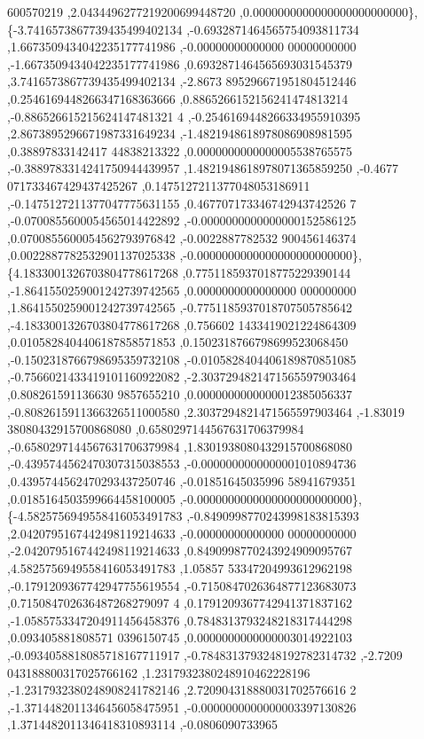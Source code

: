 \begin{DoxyCode}
      600570219 ,2.0434496277219200699448720 ,0.0000000000000000000000000\},
\{-3.7416573867739435499402134 ,-0.6932871464565754093811734 ,1.6673509434042235177741986 ,-0.00000000000000
      00000000000 ,-1.6673509434042235177741986 ,0.6932871464565693031545379 ,3.7416573867739435499402134 ,-2.8673
      895296671951804512446 ,0.2546169448266347168363666 ,0.8865266152156241474813214 ,-0.886526615215624147481321
      4 ,-0.2546169448266334955910395 ,2.8673895296671987331649234 ,-1.4821948618978086908981595 ,0.38897833142417
      44838213322 ,0.0000000000000005538765575 ,-0.3889783314241750944439957 ,1.4821948618978071365859250 ,-0.4677
      071733467429437425267 ,0.1475127211377048053186911 ,-0.1475127211377047775631155 ,0.467707173346742943742526
      7 ,-0.0700855600054565014422892 ,-0.0000000000000000152586125 ,0.0700855600054562793976842 ,-0.0022887782532
      900456146374 ,0.0022887782532901137025338 ,-0.0000000000000000000000000\},
\{4.1833001326703804778617268 ,0.7751185937018775229390144 ,-1.8641550259001242739742565 ,0.0000000000000000
      000000000 ,1.8641550259001242739742565 ,-0.7751185937018707505785642 ,-4.1833001326703804778617268 ,0.756602
      1433419021224864309 ,0.0105828404406187858571853 ,0.1502318766798699523068450 ,-0.1502318766798695359732108 
      ,-0.0105828404406189870851085 ,-0.7566021433419101160922082 ,-2.3037294821471565597903464 ,0.808261591136630
      9857655210 ,0.0000000000000012385056337 ,-0.8082615911366326511000580 ,2.3037294821471565597903464 ,-1.83019
      38080432915700868080 ,0.6580297144567631706379984 ,-0.6580297144567631706379984 ,1.8301938080432915700868080
       ,-0.4395744562470307315038553 ,-0.0000000000000001010894736 ,0.4395744562470293437250746 ,-0.01851645035996
      58941679351 ,0.0185164503599664458100005 ,-0.0000000000000000000000000\},
\{-4.5825756949558416053491783 ,-0.8490998770243998183815393 ,2.0420795167442498119214633 ,-0.00000000000000
      00000000000 ,-2.0420795167442498119214633 ,0.8490998770243924909095767 ,4.5825756949558416053491783 ,1.05857
      53347204993612962198 ,-0.1791209367742947755619554 ,-0.7150847026364877123683073 ,0.715084702636487268279097
      4 ,0.1791209367742941371837162 ,-1.0585753347204911456458376 ,0.7848313793248218317444298 ,0.093405881808571
      0396150745 ,0.0000000000000003014922103 ,-0.0934058818085718167711917 ,-0.7848313793248192782314732 ,-2.7209
      043188800317025766162 ,1.2317932380248910462228196 ,-1.2317932380248908241782146 ,2.720904318880031702576616
      2 ,-1.3714482011346456058475951 ,-0.0000000000000003397130826 ,1.3714482011346418310893114 ,-0.0806090733965

\end{DoxyCode}
